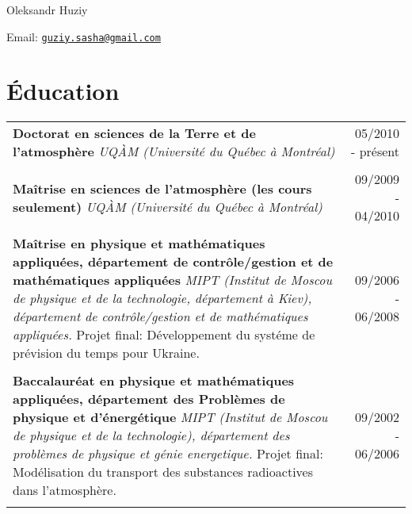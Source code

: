 \documentclass[letterpaper]{article}
\def\name{Oleksandr Huziy}
\begin{document}
{\huge \name}


\vspace{0.25in}

\begin{minipage}{0.45\linewidth}
  Email: \href{mailto:guziy.sasha@gmail.com}{\tt guziy.sasha@gmail.com}
\end{minipage}




\section*{Éducation}

\setlength\LTleft{0pt}
\setlength\LTright{0pt}

\begin{longtable}{@{}l@{\extracolsep{\fill}}r@{}}
\begin{minipage}[t]{10cm}
\textbf{Doctorat en sciences de la Terre et de l'atmosphère} \newline 
\emph{UQÀM (Université du Québec à Montréal)}
\end{minipage}
&
05/2010 - présent \\ \\

\begin{minipage}[t]{10cm}
\textbf{Maîtrise en sciences de l'atmosphère (les cours seulement)}\newline 
\emph{UQÀM (Université du Québec à Montréal)}
\end{minipage}
&
09/2009 - 04/2010 \\ \\

\begin{minipage}[t]{10cm}
\textbf{Maîtrise en physique et mathématiques appliquées, département de
contrôle/gestion et de mathématiques appliquées}\newline 
\emph{MIPT (Institut de Moscou de physique et de la technologie, département à Kiev), département de contrôle/gestion et
de mathématiques appliquées.} \newline
Projet final: Développement du systéme de prévision du temps pour Ukraine.
\end{minipage}
&
09/2006 - 06/2008 \\ \\

\begin{minipage}[t]{10cm}
\textbf{Baccalauréat en physique et mathématiques appliquées,
département des Problèmes de physique et d'énergétique}\newline 
\emph{MIPT (Institut de Moscou de physique et de la technologie), département
des problèmes de physique et génie energetique.} \newline
Projet final: Modélisation du transport des substances radioactives dans
l'atmosphère.
\end{minipage}
&
09/2002 - 06/2006 \\ \\
\end{longtable}
\end{document}
